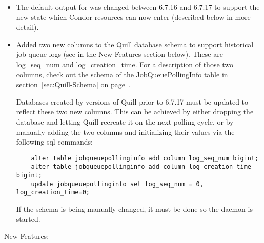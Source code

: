 \begin{itemize}

\item The default output for  was changed between
  6.7.16 and 6.7.17 to support the new  state which
  Condor resources can now enter (described below in more detail).

\item \label{param:quill-schema-change} 
Added two new columns to the Quill database schema to support 
historical job queue logs (see  
in the New Features section below). These are log\_seq\_num and 
log\_creation\_time.
  For a description of those two columns, check out the schema of 
  the JobQueuePollingInfo table in section~\ref{sec:Quill-Schema} on   
  page~\pageref{sec:Quill-Schema}.

Databases created by versions of Quill prior to 6.7.17 must be updated to 
reflect these two new columns. This can be achieved by either dropping the 
database and letting Quill recreate it on the next polling cycle, or by manually 
adding the two columns and initializing their values via the following sql commands:
\begin{verbatim}
	alter table jobqueuepollinginfo add column log_seq_num bigint;
	alter table jobqueuepollinginfo add column log_creation_time bigint;
	update jobqueuepollinginfo set log_seq_num = 0, log_creation_time=0;
\end{verbatim}
If the schema is being manually changed, it must be done so  the 
 daemon is started. 

\end{itemize}

\noindent New Features:

